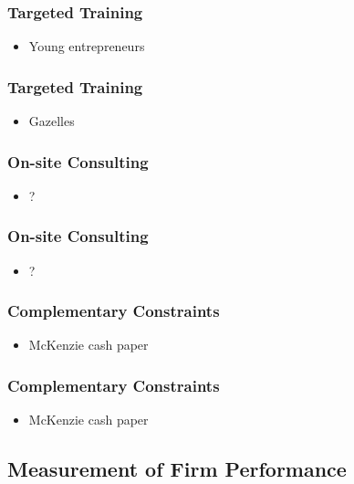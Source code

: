 \documentclass[10pt]{beamer}
\begin{document}
\begin{frame}
\frametitle{Targeted Training}
	\begin{itemize}
	\item Young entrepreneurs
	\vspace{0.1in}
	\end{itemize}
\end{frame}

\begin{frame}
\frametitle{Targeted Training}
	\begin{itemize}
	\item Gazelles
	\vspace{0.1in}
	\end{itemize}
\end{frame}


\begin{frame}
\frametitle{On-site Consulting}
	\begin{itemize}
	\item ?
	\vspace{0.1in}
	\end{itemize}
\end{frame}

\begin{frame}
\frametitle{On-site Consulting}
	\begin{itemize}
	\item ?
	\vspace{0.1in}
	\end{itemize}
\end{frame}


\begin{frame}
\frametitle{Complementary Constraints}
	\begin{itemize}
	\item McKenzie cash paper
	\vspace{0.1in}
	\end{itemize}
\end{frame}

\begin{frame}
\frametitle{Complementary Constraints}
	\begin{itemize}
	\item McKenzie cash paper
	\vspace{0.1in}
	\end{itemize}
\end{frame}


\subsection{Measurement of Firm Performance}
\end{document}
